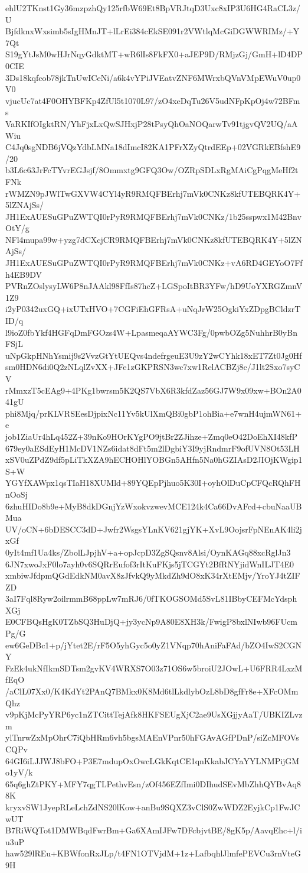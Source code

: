 ehlU2TKnst1Gy36mzpzhQy125rfbW69Et8BpVRJtqD3Uxc8xIP3U6HG4RaCL3z/U
BjfdknxWxsimb5sIgHMnJT+lLrEi384cEkSE091r2VWtlqMcGiDGWWRIMz/+Y7Qt
S19gYtJsM0wHJrNqyGdktMT+wR6lIs8FkFX0+aJEP9D/RMjzGj/GmH+lD4DP0CIE
3Ds18kqfcob78jkTnUwICeNi/a6k4vYPiJVEatvZNF6MWrxbQVnVMpEWuV0up0V0
vjucUc7at4F0OHYBFKp4ZfUl5t1070L97/zO4xeDqTu26V5udNFpKpOj4w72BFms
VaRKIfOIgktRN/YhFjxLxQwSJHxjP28tPsyQhOaNOQarwTv91tjgvQV2UQ/aAWiu
C4Jq0sgNDB6jVQzYdbLMNa18dImcI82KA1PFrXZyQtrdEEp+02VGRkEBfshE9/20
b3L6c63JrFcTYvrEGJsjf/8Ommxtg9GFQ3Ow/OZRpSDLxRgMAiCgPqgMeHf2tFNk
rWMZN9pJWlTwGXVW4CYl4yR9RMQFBErhj7mVk0CNKz8kfUTEBQRK4Y+5lZNAjSs/
JH1ExAUESuGPuZWTQI0rPyR9RMQFBErhj7mVk0CNKz/1b25sspwx1M42BnvOtY/g
NFl4mupa99w+yzg7dCXcjCR9RMQFBErhj7mVk0CNKz8kfUTEBQRK4Y+5lZNAjSs/
JH1ExAUESuGPuZWTQI0rPyR9RMQFBErhj7mVk0CNKz+vA6RD4GEYoO7Ffh4EB9DV
PVRnZOslysyLW6P8nJAAkl98FfIs87hcZ+LGSpoItBR3YFw/hD9UoYXRGZmnV1Z9
i2yP0342uxGQ+ixUTxHVO+7CGFiEhGFRsA+uNqJrW25OgkiYxZDpgBCldzrTID/q
l9ioZ0fbYkf4HGFqDmFGOzs4W+LpasmeqaAYWC3Fg/0pwbOZg5NuhhrB0yBnFSjL
uNpGkpHNhYsmij9s2VvzGtYtUEQvs4ndefrgeuE3U9zY2wCYhk18xET7Zt0Jg0Hf
sm0HDN6di0Q2zNLqlZvXX+JFe1zGKPRSN3wc7xw1RelACBZj8c/J1lt2Sxo7syCV
rMmxzT5cEAg9+4PKg1bwrsm5K2QS7VbX6R3kfdZaz56GJ7W9x09xw+BOn2A041gU
phi8Mjq/prKLVRSEesDjpixNc11Yv5kUlXmQBi0gbP1ohBia+e7wnH4ujmWN61+e
job1ZiaUr4hLq452Z+39nKo9HOrKYgPO9jtBr2ZJihze+Zmq0eO42DoEhXI48kfP
679ey0aESdEyH1McDV1NZs6idat8dFt5m2lDgbiY3I9yjRndmrF9ofUVN8Ot53LH
xSV0uZPdZ9df5pLiTkXZA9hECHOHlYOBGn5AHfn5Na0hGZIAsD2JIOjKWgip1S+W
YGYfXAWpx1qsTIaH18XUMld+89YQEpPjhuo5K30I+oyhOlDuCpCFQcRQhFHnOoSj
6zhuHIDo8b9e+MyB8dkDGnjYzWxokvzwevMCE124k4Ca66DvAFcd+cbuNaaUBMua
UV/oCN+6bDESCC3dD+Jwfr2WsgsYLnKV621gjYK+XvL9OojsrFpNEnAK4li2jxGf
0yIt4mf1Ua4ks/ZbolLJpjhV+a+opJcpD3ZgSQsnv8Alsi/OynKAGq88xcRglJn3
6JN7xwoJxF0lo7ayh0v6SQRrEufof3rItKuFKjs5jTCGYt2BfRNYjidWnILJT4E0
xmbiwJfdpmQGdEdkNM0avX8zJfvkQ9yMkdZh9dO8xK34rXtEMjv/YroYJ4tZIFZD
3aI7Fql8Ryw2oilrmmB68ppLw7mRJ6/0fTKOGSOMd5SvL81IBbyCEFMcYdsphXGj
E0CFBQsHgK0TZbSQ3HuDjQ+jy3ycNp9A80E8XH3k/FwigP8bxlNIwb96FUcmPg/G
ew6GeDBc1+p/jYtet2E/rF5O5yhGyc5o0yZ1VNqp70hAniFaFAd/bZO4IwS2CGNY
FzEk4ukNfIkmSDTsm2gvKV4WRXS7O03z71OS6w5broiU2JOwL+U6FRR4LxzMfEqO
/aClL07Xx0/K4KdYt2PAnQ7BMkx0K8Md6tlLkdlybOzL8bD8gfFr8e+XFcOMmQhz
v9pKjMcPyYRP6yc1nZTCittTejAfk8HKFSEUgXjC2ae9UsXGjjyAaT/UBKIZLvzm
ylTnrwZxMpOhrC7iQbHRm6vh5bgsMAEnVPnr50hFGAvAGfPDnP/siZcMFOVsCQPv
64GI6iLJJWJ8bFO+P3E7mdupOxOwcLGkKqtCE1qnKkabJCYaYYLNMPijGMo1yV/k
65q6ghZtPKY+MFY7qgTLPethvEsn/zOf456EZfImi0DIhudSEvMbZhhQYBvAq88K
kryxvSW1JyepRLeLchZdNS20lKow+anBu9SQXZ3vClS0ZwWDZ2EyjkCp1FwJCwUT
B7RiWQTot1DMWBqdFwrBm+Ga6XAmIJFw7DFcbjvtBE/8gK5p/AavqEhc+l/iu3uP
haw529lREu+KBWfonRxJLp/t4FN1OTVjdM+1z+LafbqhlJlmfePEVCu3rnVteG9H
